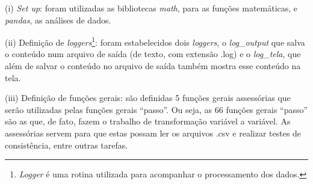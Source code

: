 \begin{compactitem}[]
\item (i) \textit{Set up}: foram utilizadas as bibliotecas \textit{math}, para as funções matemáticas, e \textit{pandas}, as análises de dados.\\

\item (ii) Definição de \textit{loggers}\footnote{\textit{Logger} é uma rotina utilizada para acompanhar o processamento dos dados.}: foram estabelecidos dois \textit{loggers}, o \textit{log_output} que salva o conteúdo num arquivo de saída (de texto, com extensão .log) e o \textit{log_tela}, que além de salvar o conteúdo no arquivo de saída também mostra esse conteúdo na tela.\\

\item (iii) Definição de funções gerais: são definidas 5 funções gerais assessórias que serão utilizadas pelas funções gerais ``passo”. Ou seja, as 66 funções gerais ``passo'' são as que, de fato, fazem o trabalho de transformação variável a variável. As assessórias servem para que estas possam ler os arquivos .csv e realizar testes de consistência, entre outras tarefas.\\


\end{compactitem}
